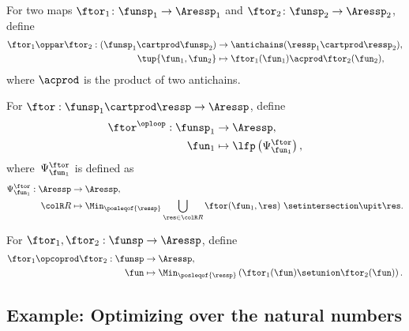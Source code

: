 \begin{definition}
	 \label{def:oppar}
	For two maps $\ftor_{1}\colon\funsp_{1}\rightarrow\Aressp_{1}$ and $\ftor_{2}\colon\funsp_{2}\rightarrow\Aressp_{2}$, define
	\begin{align}
		\ftor_{1}\oppar\ftor_{2}:(\funsp_{1}\cartprod\funsp_{2}) & \rightarrow\antichains(\ressp_{1}\cartprod\ressp_{2}),\label{eq:oppar} \\
		\tup{ \fun_{1},\fun_{2}}                                 & \mapsto\ftor_{1}(\fun_{1})\acprod\ftor_{2}(\fun_{2}),\nonumber
	\end{align}
	where $\acprod$ is the product of two antichains.
\end{definition}

\begin{definition}
	\label{def:oploop1}
	For $\ftor:\funsp_{1}\cartprod\ressp\rightarrow\Aressp$,
	define
	\begin{align}
		\ftor^{\oploop}:\funsp_{1} & \rightarrow\Aressp,\nonumber                     \\
		\fun_{1}                   & \mapsto\lfp\left(\Psi_{\fun_{1}}^{\ftor}\right),
	\end{align}
	where~$\Psi_{\fun_{1}}^{\ftor}$ is defined as
	\begin{align}
		\Psi_{\fun_{1}}^{\ftor}:\Aressp & \rightarrow\Aressp,\nonumber                                                                              \\
		{\colR R}                       & \mapsto\Min_{\posleqof{\ressp}}\bigcup_{\res\in{\colR R}}\ftor(\fun_{1},\res)\ \setintersection\upit\res.
		\label{eq:phi}
	\end{align}
\end{definition}

\begin{definition}
	\label{def:opcoprod}
	For $\ftor_{1},\ftor_{2}:\funsp\rightarrow\Aressp$,
	define
	\begin{align*}
		\ftor_{1}\opcoprod\ftor_{2}:\funsp & \rightarrow\Aressp,                                                                  \\
		\fun                               & \mapsto\Min_{\posleqof{\ressp}}\left(\ftor_{1}(\fun)\setunion\ftor_{2}(\fun)\right).
	\end{align*}
\end{definition}

\subsection{Example: Optimizing over the natural numbers}

